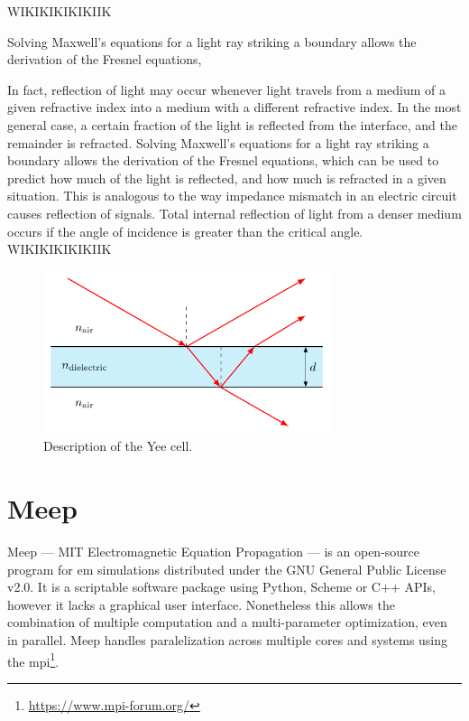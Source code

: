 WIKIKIKIKIKIIK

Solving Maxwell's equations for a light ray striking a boundary allows the derivation of the Fresnel equations,

In fact, reflection of light may occur whenever light travels from a medium of a given refractive index into a medium with a different refractive index. In the most general case, a certain fraction of the light is reflected from the interface, and the remainder is refracted. Solving Maxwell's equations for a light ray striking a boundary allows the derivation of the Fresnel equations, which can be used to predict how much of the light is reflected, and how much is refracted in a given situation. This is analogous to the way impedance mismatch in an electric circuit causes reflection of signals. Total internal reflection of light from a denser medium occurs if the angle of incidence is greater than the critical angle. 
WIKIKIKIKIKIIK


\begin{figure}[H]\label{fig:thin-film}
  \centering
  \includegraphics[width=0.75\textwidth]{figures/thin-film.pdf}
  \caption{Description of the Yee cell.}
\end{figure}




\section{Meep}\label{sec:meep}
Meep --- MIT Electromagnetic Equation Propagation --- is an open-source program for \gls{em} simulations distributed under the GNU General Public License v2.0. It is a scriptable software package using Python, Scheme or C++ APIs, however it lacks a graphical user interface. Nonetheless this allows the combination of multiple computation and a multi-parameter optimization, even in parallel. Meep handles paralelization across multiple cores and systems using the \gls{mpi}\footnote{\url{https://www.mpi-forum.org/}}. 

